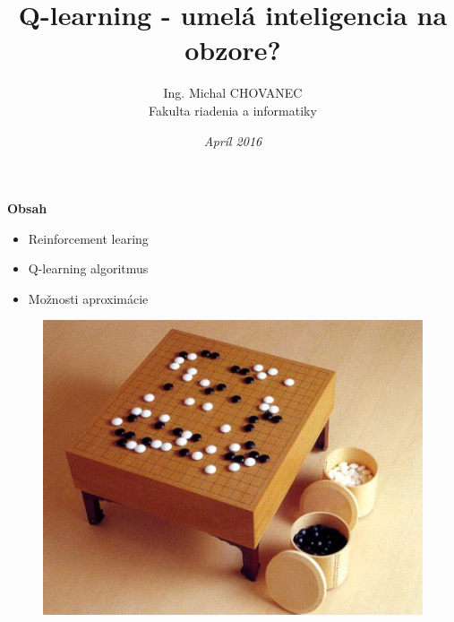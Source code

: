 \documentclass[xcolor=dvipsnames]{beamer}
\title{\bf Q-learning - umelá inteligencia na obzore?}
\author{Ing. Michal CHOVANEC \\Fakulta riadenia a informatiky}
\date[EURP]{\it Apríl 2016}
\begin{document}
\begin{frame}
\titlepage
\end{frame}




\begin{frame}{\bf Obsah}

\begin{minipage}{.5\textwidth}

\begin{itemize}
  \item Reinforcement learing
  \item Q-learning algoritmus
  \item Možnosti aproximácie
\end{itemize}

  \end{minipage}%
\begin{minipage}{.5\textwidth}

  \begin{figure}[!htb]
  \centering
  \includegraphics[scale=.8]{../pictures/go.jpg}
  \end{figure}

\end{minipage}

\end{frame}
\end{document}
